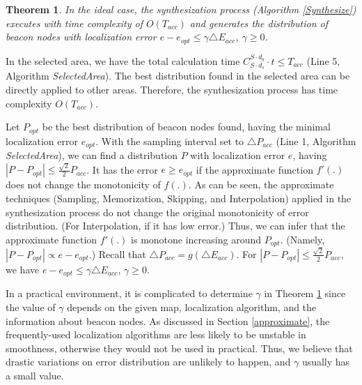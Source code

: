 \documentclass[10pt, conference, letterpaper]{IEEEtran}
\newtheorem{thm}{Theorem}
\begin{document}
\begin{thm} \label{thm_synthesize}
In the ideal case, the synthesization process (Algorithm \ref{Synthesize}) executes with time complexity of $O(T_{acc})$ and generates the distribution of beacon nodes with localization error $e-e_{opt} \leq \gamma \triangle E_{acc}$, $\gamma \geq 0$.
\end{thm}
\begin{IEEEproof}
In the selected area, we have the total calculation time $C_{S \cdot d_s}^{S \cdot d_b} \cdot t \leq T_{acc}$ (Line 5, Algorithm \textit{SelectedArea}). The best distribution found in the selected area can be directly applied to other areas. Therefore, the synthesization process has time complexity $O(T_{acc})$.

Let $P_{opt}$ be the best distribution of beacon nodes found, having the minimal localization error $e_{opt}$. With the sampling interval set to $\triangle P_{acc}$ (Line 1, Algorithm \textit{SelectedArea}), we can find a distribution $P$ with localization error $e$, having $|P-P_{opt}| \leq \frac{\sqrt{2}}{2} P_{acc}$. It has the error $e \geq e_{opt}$ if the approximate function $f'(.)$ does not change the monotonicity of $f(.)$. As can be seen, the approximate techniques (Sampling, Memorization, Skipping, and Interpolation) applied in the synthesization process do not change the original monotonicity of error distribution. (For Interpolation, if it has low error.) Thus, we can infer that the approximate function $f'(.)$ is monotone increasing around $P_{opt}$. (Namely, $|P - P_{opt}| \varpropto e-e_{opt}$.) Recall that $\triangle P_{acc}=g(\triangle E_{acc})$. For $|P-P_{opt}| \leq \frac{\sqrt{2}}{2} P_{acc}$, we have $e-e_{opt} \leq \gamma \triangle E_{acc}$, $\gamma \geq 0$.
\end{IEEEproof}

In a practical environment, it is complicated to determine $\gamma$ in Theorem \ref{thm_synthesize} since the value of $\gamma$ depends on the given map, localization algorithm, and the information about beacon nodes. As discussed in Section \ref{approximate}, the frequently-used localization algorithms are less likely to be unstable in smoothness, otherwise they would not be used in practical. Thus, we believe that drastic variations on error distribution are unlikely to happen, and $\gamma$ usually has a small value.
\end{document}
